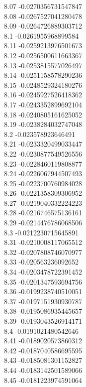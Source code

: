 {8.07	-0.0270356731547847\\
8.08	-0.0267527041280478\\
8.09	-0.0264726889303712\\
8.1	-0.0261955968899584\\
8.11	-0.0259213976501673\\
8.12	-0.0256500611663367\\
8.13	-0.0253815577026497\\
8.14	-0.0251158578290236\\
8.15	-0.0248529324180276\\
8.16	-0.0245927526418362\\
8.17	-0.0243352899692104\\
8.18	-0.0240805161625052\\
8.19	-0.0238284032747048\\
8.2	-0.023578923646491\\
8.21	-0.0233320499033447\\
8.22	-0.0230877549526556\\
8.23	-0.0228460119808877\\
8.24	-0.0226067944507493\\
8.25	-0.0223700760984028\\
8.26	-0.0221358309306952\\
8.27	-0.0219040332224223\\
8.28	-0.0216746575136161\\
8.29	-0.0214476786068506\\
8.3	-0.0212230715645891\\
8.31	-0.0210008117065512\\
8.32	-0.0207808746070977\\
8.33	-0.020563236092652\\
8.34	-0.0203478722391452\\
8.35	-0.0201347593694756\\
8.36	-0.0199238740510051\\
8.37	-0.0197151930930787\\
8.38	-0.0195086935445657\\
8.39	-0.0193043526914171\\
8.4	-0.0191021480542646\\
8.41	-0.0189020573860312\\
8.42	-0.0187040586695595\\
8.43	-0.0185081301152827\\
8.44	-0.0183142501589066\\
8.45	-0.0181223974591064\\
}
